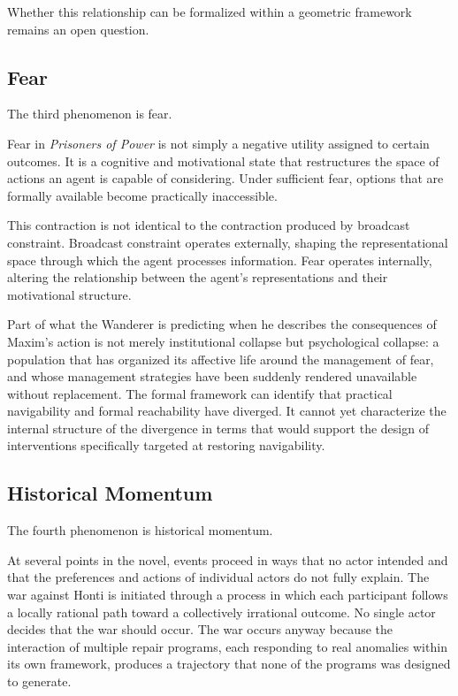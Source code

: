 \documentclass[12pt, a4paper]{article}
\theoremstyle{plain}
\theoremstyle{definition}
\theoremstyle{remark}
\begin{document}
Whether this relationship can be formalized within
a geometric framework remains an open question.

\subsection{Fear}

The third phenomenon is fear.

Fear in \textit{Prisoners of Power} is not simply
a negative utility assigned to certain outcomes.
It is a cognitive and motivational state that
restructures the space of actions an agent is
capable of considering. Under sufficient fear,
options that are formally available become
practically inaccessible.

This contraction is not identical to the
contraction produced by broadcast constraint.
Broadcast constraint operates externally, shaping
the representational space through which the agent
processes information. Fear operates internally,
altering the relationship between the agent's
representations and their motivational structure.

Part of what the Wanderer is predicting when he
describes the consequences of Maxim's action is
not merely institutional collapse but psychological
collapse: a population that has organized its
affective life around the management of fear,
and whose management strategies have been suddenly
rendered unavailable without replacement. The
formal framework can identify that practical
navigability and formal reachability have diverged.
It cannot yet characterize the internal structure
of the divergence in terms that would support the
design of interventions specifically targeted at
restoring navigability.

\subsection{Historical Momentum}

The fourth phenomenon is historical momentum.

At several points in the novel, events proceed in
ways that no actor intended and that the preferences
and actions of individual actors do not fully
explain. The war against Honti is initiated through
a process in which each participant follows a
locally rational path toward a collectively
irrational outcome. No single actor decides that
the war should occur. The war occurs anyway because
the interaction of multiple repair programs, each
responding to real anomalies within its own
framework, produces a trajectory that none of the
programs was designed to generate.
\end{document}
